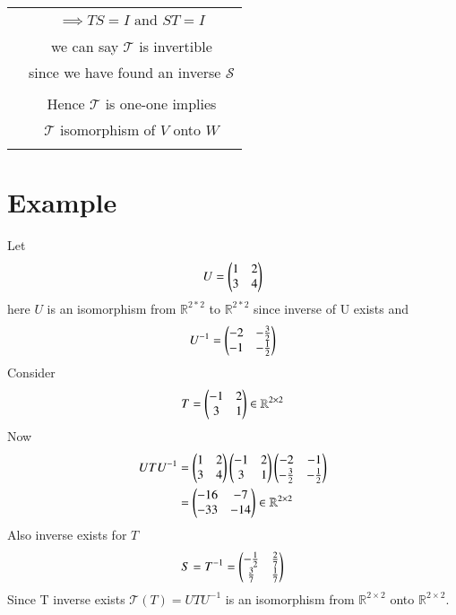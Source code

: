 \documentclass[journal,12pt,twocolumn]{IEEEtran}
\begin{document}
\begin{table}[h]
\begin{center}
\begin{tabular}{|c|c|}
& \\
& $\implies TS = I \text{ and } ST = I$\\
& \\
& we can say $\mathcal{T}$ is invertible\\
& since we have found an inverse $\mathcal{S}$\\
& \\
& Hence $\mathcal{T}$ is one-one implies \\
& $\mathcal{T}$ isomorphism of $V$ onto $W$\\
&\\
\hline
\end{tabular}
\end{center}
\end{table}
\section{Example}
Let
\begin{equation}
	U = \begin{pmatrix}1 & 2\\3 & 4\end{pmatrix}
\end{equation}
here $U$ is an isomorphism from $\mathbb{R}^{2*2}$ to $\mathbb{R}^{2*2}$ since inverse of U exists and
\begin{equation}
	U^{-1} = \begin{pmatrix}-2 & -\frac{3}{2}\\-1 & -\frac{1}{2}\end{pmatrix}
\end{equation}
Consider
\begin{equation}
	T = \begin{pmatrix}-1 & 2\\3 & 1\end{pmatrix} \in \mathbb{R}^{2 \times 2}
\end{equation}
Now
\begin{align}
	UTU^{-1} &= \begin{pmatrix}1 & 2\\3 & 4\end{pmatrix}\begin{pmatrix}-1 & 2\\3 & 1\end{pmatrix}\begin{pmatrix}-2 & -1\\-\frac{3}{2} & -\frac{1}{2}\end{pmatrix}\\
	&= \begin{pmatrix}-16 & -7\\-33 & -14\end{pmatrix} \in \mathbb{R}^{2 \times 2}
\end{align}
Also inverse exists for $T$
\begin{align}
	S = T^{-1} = \begin{pmatrix}-\frac{1}{2} & \frac{2}{7}\\\frac{3}{7} & \frac{1}{7}\end{pmatrix}
\end{align}
Since T inverse exists $\mathcal{T}(T) = UTU^{-1}$ is an isomorphism from $\mathbb{R}^{2\times2}$ onto $\mathbb{R}^{2\times2}$.  
\end{document}
